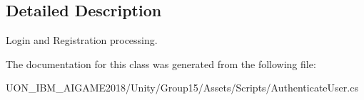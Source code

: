 \subsection{Detailed Description}
Login and Registration processing. 

The documentation for this class was generated from the following file\+:\begin{DoxyCompactItemize}
\item 
U\+O\+N\+\_\+\+I\+B\+M\+\_\+\+A\+I\+G\+A\+M\+E2018/\+Unity/\+Group15/\+Assets/\+Scripts/Authenticate\+User.\+cs\end{DoxyCompactItemize}
